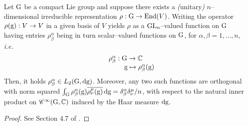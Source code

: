 {\begin{teo}\label{peter_weyl}
    Let $\text{\normalfont G}$ be a compact Lie group and suppose there exists a \emph{(}unitary\emph{)} $n$--dimensional irreducible representation $\rho:\text{\normalfont G}\to\text{\normalfont End}(V)$. Writing the operator $\rho(\text{\normalfont g}):V\to V$ in a given basis of $V$ yields $\rho$ as a $\text{\normalfont GL}_n$--valued function on $\text{\normalfont G}$ having entries $\rho^\alpha_\beta$ being in turn scalar--valued functions on $\text{\normalfont G}$, for $\alpha,\beta=1,\hdots,n$, \emph{i.e.}
    $$\begin{matrix}
        \rho^\alpha_\beta:\text{\normalfont G}\to\mathbb{C}\\
        \qquad\qquad\text{\normalfont g}\mapsto\rho^\alpha_\beta(\text{\normalfont g})
    \end{matrix}$$
    Then, it holds $\rho^\alpha_\beta\in L_2(\text{\normalfont G},\text{\normalfont d}\text{\normalfont g})$. Moreover, any two such functions are orthogonal with norm squared $\int_{\text{\normalfont G}}\rho^\alpha_\beta(\text{\normalfont g})\overline{\rho^\mu_\nu(\text{\normalfont g})}\,\text{\normalfont d}\text{\normalfont g}=\delta^\alpha_\beta\delta^\mu_\nu/{n}$, with respect to the natural inner product on $\mathscr{C}^\infty(\text{\normalfont G},\mathbb{C})$ induced by the Haar measure $\text{\normalfont d}\text{\normalfont g}$.
    \end{teo}}
    

    
 

{\begin{proof}
    See Section 4.7 of \cite{kirillov}.
\end{proof}}

